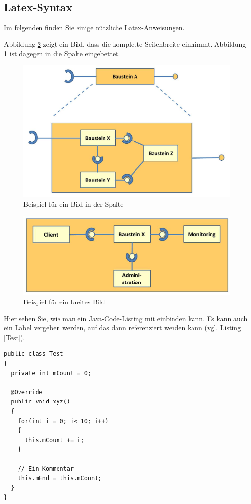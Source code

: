 \documentclass[fleqn,10pt,ngerman]{SelfArx}
\begin{document}
\subsection{Latex-Syntax}
Im folgenden finden Sie einige nützliche Latex-Anweisungen.

Abbildung \ref{fig:MultiInterfaces} zeigt ein Bild, dass die komplette Seitenbreite einnimmt. Abbildung \ref{fig:Baustein} ist dagegen in die Spalte eingebettet.


\begin{figure}[ht]\centering
	\includegraphics[width=5 cm]{Abbildungen/Baustein}
	\caption{Beispiel für ein Bild in der Spalte}
	\label{fig:Baustein}
\end{figure}

\begin{figure}[ht]\centering %
	\includegraphics[width=\linewidth]{Abbildungen/BausteinMultiInterfaces}
	\caption{Beispiel für ein breites Bild}
	\label{fig:MultiInterfaces}
\end{figure}

Hier sehen Sie, wie man ein Java-Code-Listing mit einbinden kann. Es kann auch ein Label vergeben werden, auf das dann referenziert werden kann (vgl. Listing \ref{Test}). 
\begin{lstlisting}[caption=Eine Testklasse, label=Test]
public class Test
{
  private int mCount = 0;
	
  @Override	
  public void xyz()
  {
    for(int i = 0; i< 10; i++)
    {
      this.mCount += i;
    }
	
    // Ein Kommentar		
    this.mEnd = this.mCount;
  }
}
\end{lstlisting}
\end{document}
